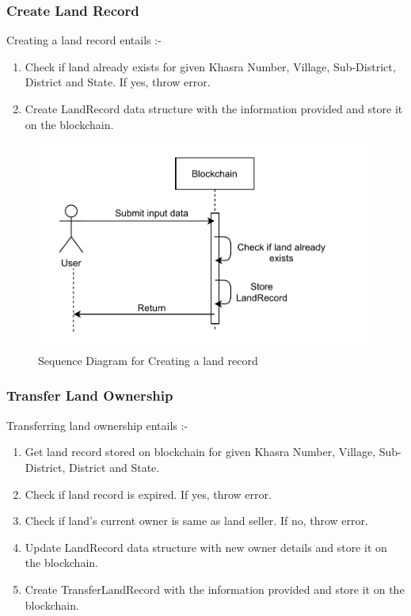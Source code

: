 \documentclass{article}
\begin{document}
    \subsubsection{Create Land Record}
        Creating a land record entails :-
        \begin{enumerate}
            \item Check if land already exists for given Khasra Number, Village, Sub-District, District and State. If yes, throw error.
            \item Create LandRecord data structure with the information provided and store it on the blockchain.
        \end{enumerate}

        \begin{figure}[htbp]
            \includegraphics[scale=0.25]{blockchain_seq_create_land}
            \centering
            \caption{Sequence Diagram for Creating a land record}
        \end{figure}

    \subsubsection{Transfer Land Ownership}
        Transferring land ownership entails :-
        \begin{enumerate}
            \item Get land record stored on blockchain for given Khasra Number, Village, Sub-District, District and State.
            \item Check if land record is expired. If yes, throw error.
            \item Check if land's current owner is same as land seller. If no, throw error.
            \item Update LandRecord data structure with new owner details and store it on the blockchain.
            \item Create TransferLandRecord with the information provided and store it on the blockchain.
        \end{enumerate}
\end{document}
